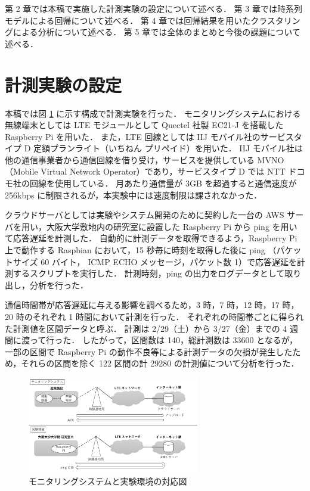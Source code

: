 \documentclass[technicalreport]{ieicej}
\begin{document}
第 2 章では本稿で実施した計測実験の設定について述べる．
第 3 章では時系列モデルによる回帰について述べる．
第 4 章では回帰結果を用いたクラスタリングによる分析について述べる．
第 5 章では全体のまとめと今後の課題について述べる．
\section{計測実験の設定}
本稿では図 \ref{exp} に示す構成で計測実験を行った．
モニタリングシステムにおける無線端末としては LTE モジュールとして Quectel 社製 EC21-J を搭載した Raspberry Pi を用いた．
また，LTE 回線としては IIJ モバイル社のサービスタイプ D 定額プランライト（いちねん プリペイド）を用いた．
IIJ モバイル社は他の通信事業者から通信回線を借り受け，サービスを提供している MVNO（Mobile Virtual Network Operator）であり，サービスタイプ D では NTT ドコモ社の回線を使用している．
月あたり通信量が 3GB を超過すると通信速度が 256kbps に制限されるが，本実験中には速度制限は課されなかった．

クラウドサーバとしては実験やシステム開発のために契約した一台の AWS サーバを用い，大阪大学敷地内の研究室に設置した Raspberry Pi から ping を用いて応答遅延を計測した．
自動的に計測データを取得できるよう，Raspberry Pi 上で動作する Raspbian において，15 秒毎に時刻を取得した後に ping （パケットサイズ 60 バイト， ICMP ECHO メッセージ，パケット数 1）で応答遅延を計測するスクリプトを実行した．
計測時刻，ping の出力をログデータとして取り出し，分析を行った．

通信時間帯が応答遅延に与える影響を調べるため，3 時，7 時，12 時，17 時，20 時のそれぞれ 1 時間において計測を行った．
それぞれの時間帯ごとに得られた計測値を区間データと呼ぶ．
計測は 2/29（土）から 3/27（金）までの 4 週間に渡って行った．
したがって，区間数は 140，総計測数は 33600 となるが，一部の区間で Raspberry Pi の動作不良等による計測データの欠損が発生したため，それらの区間を除く 122 区間の計 29280 の計測値について分析を行った．

\begin{figure}[tb]
\centering
\includegraphics[width=7.5cm]{experiment.pdf}
\caption{モニタリングシステムと実験環境の対応図}
\label{exp}
\end{figure}
\end{document}

